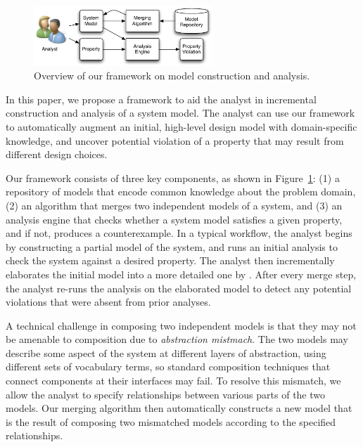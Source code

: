 \begin{figure}[!t]
\centering
\includegraphics[width=0.60\textwidth]{diagrams/overview}
\caption{Overview of our framework on model construction and analysis.}
\label{fig-overview}
\end{figure}

In this paper, we propose a framework to aid the analyst in
incremental construction and analysis of a system model. The analyst
can use our framework to automatically augment an initial, high-level
design model with domain-specific knowledge, and uncover potential
violation of a property that may result from different design choices.

Our framework consists of three key components, as shown in
Figure~\ref{fig-overview}: (1) a repository of models that encode
common knowledge about the problem domain, (2) an algorithm that
merges two independent models of a system, and (3) an analysis engine
that checks whether a system model satisfies a given property, and if
not, produces a counterexample. In a typical workflow, the analyst
begins by constructing a partial model of the system, and runs an
initial analysis to check the system against a desired property. The
analyst then incrementally elaborates the initial model into a more
detailed one by . After every merge step, the
analyst re-runs the analysis on the elaborated model to detect any
potential violations that were absent from prior analyses.

A technical challenge in composing two independent models is that they
may not be amenable to composition due to \textit{abstraction
  mistmach}. The two models may describe some aspect of the system
at different layers of abstraction, using different sets of vocabulary
terms, so standard composition techniques that connect components at
their interfaces may fail. To resolve this mismatch, we allow the
analyst to specify relationships between various parts of the two
models. Our merging algorithm then automatically constructs a new
model that is the result of composing two mismatched models according
to the specified relationships.

